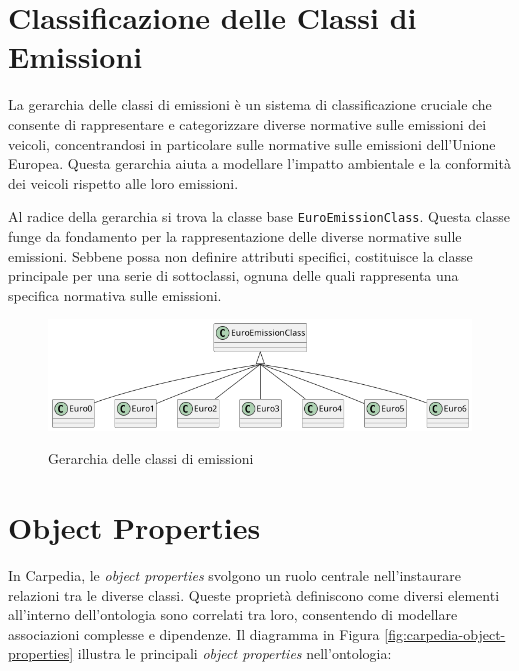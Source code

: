 \section{Classificazione delle Classi di Emissioni}

La gerarchia delle classi di emissioni è un sistema di classificazione cruciale che  consente di rappresentare e categorizzare diverse normative sulle emissioni dei veicoli, concentrandosi in particolare sulle normative sulle emissioni dell'Unione Europea. Questa gerarchia aiuta a modellare l'impatto ambientale e la conformità dei veicoli rispetto alle loro emissioni.

Al radice della gerarchia si trova la classe base \texttt{EuroEmissionClass}. Questa classe funge da fondamento per la rappresentazione delle diverse normative sulle emissioni. Sebbene possa non definire attributi specifici, costituisce la classe principale per una serie di sottoclassi, ognuna delle quali rappresenta una specifica normativa sulle emissioni.

\begin{figure}[H]
    \caption{Gerarchia delle classi di emissioni}
    \includegraphics[width=\textwidth]{figures/carpedia-euro-emission.png}
    \label{fig:carpedia-euro-emission}
\end{figure}

\section{Object Properties}

In Carpedia, le \textit{object properties} svolgono un ruolo centrale nell'instaurare relazioni tra le diverse classi. Queste proprietà definiscono come diversi elementi all'interno dell'ontologia sono correlati tra loro, consentendo di modellare associazioni complesse e dipendenze. Il diagramma in Figura \ref{fig:carpedia-object-properties} illustra le principali \textit{object properties} nell'ontologia:

